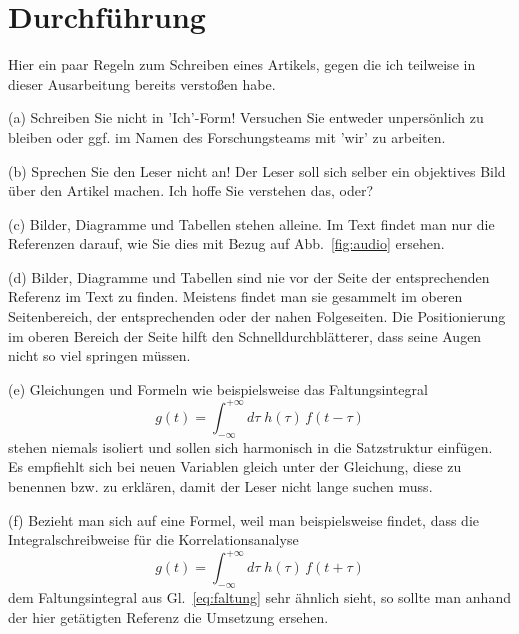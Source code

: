 \section{Durchführung}

Hier ein paar Regeln zum Schreiben eines Artikels, 
gegen die ich teilweise in dieser Ausarbeitung bereits
verstoßen habe.
\begin{list}{-}{}
\item[(a)] Schreiben Sie nicht in 'Ich'-Form! Versuchen Sie entweder 
unpersönlich zu bleiben oder ggf. im Namen des Forschungsteams mit 'wir' zu arbeiten.

\item[(b)] Sprechen Sie den Leser nicht an! Der Leser soll sich selber ein
objektives Bild über den Artikel machen. Ich hoffe Sie verstehen das, oder?

\item[(c)] Bilder, Diagramme und Tabellen stehen alleine. Im Text findet man
nur die Referenzen darauf, wie Sie dies mit Bezug auf
Abb.~\ref{fig:audio} ersehen.

\item[(d)] Bilder, Diagramme und Tabellen sind nie vor der Seite der entsprechenden 
Referenz im Text zu finden. Meistens findet man sie gesammelt im oberen
Seitenbereich, der entsprechenden oder der nahen Folgeseiten. Die Positionierung
im oberen Bereich der Seite hilft den Schnelldurchblätterer, dass seine 
Augen nicht so viel springen müssen.

\item[(e)] Gleichungen und Formeln wie beispielsweise das Faltungsintegral
\begin{equation}
g(t) = \int_{-\infty}^{+\infty}\!\!d\tau \; h(\tau) \, f(t-\tau)
\label{eq:faltung}
\end{equation}
stehen niemals isoliert und sollen sich harmonisch in die Satzstruktur einfügen.
Es empfiehlt sich bei neuen Variablen gleich unter der Gleichung, diese
zu benennen bzw. zu erklären, damit der Leser nicht lange suchen muss.

\item[(f)] Bezieht man sich auf eine Formel, weil man beispielsweise findet,
dass die Integralschreibweise für die Korrelationsanalyse 
\begin{equation}
g(t) = \int_{-\infty}^{+\infty}\!\!d\tau \; h(\tau) \, f(t + \tau)
\end{equation}
dem Faltungsintegral aus Gl.~\eqref{eq:faltung} sehr ähnlich sieht,
so sollte man anhand der hier getätigten Referenz die Umsetzung ersehen.


\end{list}
